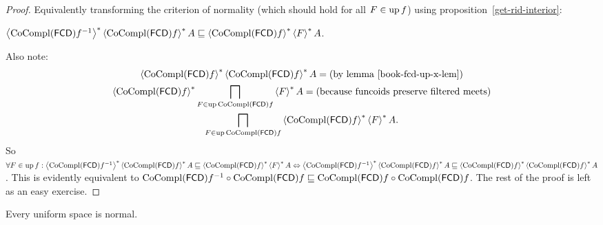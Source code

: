 \begin{proof}
  Equivalently transforming the criterion of normality (which should hold for
  all $F \in \operatorname{up} f$) using proposition~\ref{get-rid-interior}:

  $\left\langle \operatorname{CoCompl} (\mathsf{FCD}) f^{- 1}\right\rangle ^{\ast}
  \left\langle \operatorname{CoCompl} (\mathsf{FCD}) f\right\rangle ^{\ast} A \sqsubseteq
  \left\langle \operatorname{CoCompl} (\mathsf{FCD}) f\right\rangle ^{\ast} \left\langle F\right\rangle ^{\ast} A$.
  
  Also note:
  \begin{multline*}
     \rsupfun{\CoCompl (\mathsf{FCD}) f} \rsupfun{\CoCompl (\mathsf{FCD}) f} A = \text{(by lemma~\bookref{fcd-up-x-lem})} \\
     \rsupfun{\CoCompl (\mathsf{FCD}) f} \bigsqcap_{F \in \up \CoCompl (\mathsf{FCD}) f} \rsupfun{F} A = \text{(because funcoids preserve filtered meets)} \\
     \bigsqcap_{F \in \up \CoCompl (\mathsf{FCD}) f} \rsupfun{\CoCompl (\mathsf{FCD}) f} \rsupfun{F}
     A.
  \end{multline*}
  So $\forall F \in \operatorname{up} f : \left\langle  \operatorname{CoCompl} (\mathsf{FCD}) f^{- 1}
  \right\rangle ^{\ast} \left\langle \operatorname{CoCompl} (\mathsf{FCD}) f\right\rangle ^{\ast} A \sqsubseteq
  \left\langle \operatorname{CoCompl} (\mathsf{FCD}) f\right\rangle ^{\ast} \left\langle F\right\rangle ^{\ast} A
  \Leftrightarrow \left\langle \operatorname{CoCompl} (\mathsf{FCD}) f^{- 1}\right\rangle ^{\ast}
  \left\langle \operatorname{CoCompl} (\mathsf{FCD}) f\right\rangle ^{\ast} A \sqsubseteq
  \left\langle \operatorname{CoCompl} (\mathsf{FCD}) f\right\rangle ^{\ast} \left\langle \operatorname{CoCompl} (\mathsf{FCD}) f\right\rangle ^{\ast} A$. This is
  evidently equivalent to $\operatorname{CoCompl} (\mathsf{FCD}) f^{- 1} \circ
  \operatorname{CoCompl} (\mathsf{FCD}) f \sqsubseteq \operatorname{CoCompl} (\mathsf{FCD}) f \circ
  \operatorname{CoCompl} (\mathsf{FCD}) f$. The rest of the proof is left as an easy exercise.
\end{proof}

\begin{cor}
  Every uniform space is normal.
\end{cor}